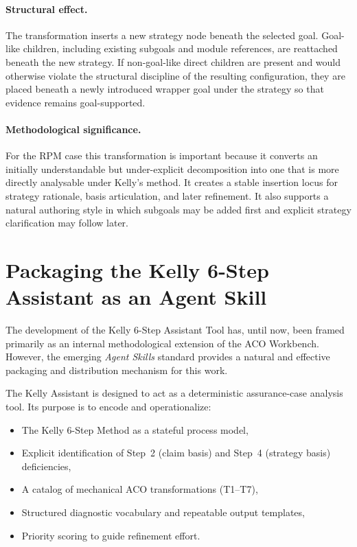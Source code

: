 \documentclass{article}
\begin{document}
\paragraph{Structural effect.}
The transformation inserts a new strategy node beneath the selected goal.
Goal-like children, including existing subgoals and module references, are reattached beneath the new strategy.
If non-goal-like direct children are present and would otherwise violate the structural discipline of the resulting configuration, they are placed beneath a newly introduced wrapper goal under the strategy so that evidence remains goal-supported.

\paragraph{Methodological significance.}
For the RPM case this transformation is important because it converts an initially understandable but under-explicit decomposition into one that is more directly analysable under Kelly's method.
It creates a stable insertion locus for strategy rationale, basis articulation, and later refinement.
It also supports a natural authoring style in which subgoals may be added first and explicit strategy clarification may follow later.



\clearpage
\section{Packaging the Kelly 6-Step Assistant as an Agent Skill}

The development of the Kelly 6-Step Assistant Tool has, until now, been framed primarily as an internal methodological extension of the ACO Workbench. However, the emerging \emph{Agent Skills} standard provides a natural and effective packaging and distribution mechanism for this work.

The Kelly Assistant is designed to act as a deterministic assurance-case analysis tool. Its purpose is to encode and operationalize:

\begin{itemize}
  \item The Kelly 6-Step Method as a stateful process model,
  \item Explicit identification of Step~2 (claim basis) and Step~4 (strategy basis) deficiencies,
  \item A catalog of mechanical ACO transformations (T1--T7),
  \item Structured diagnostic vocabulary and repeatable output templates,
  \item Priority scoring to guide refinement effort.
\end{itemize}
\end{document}
